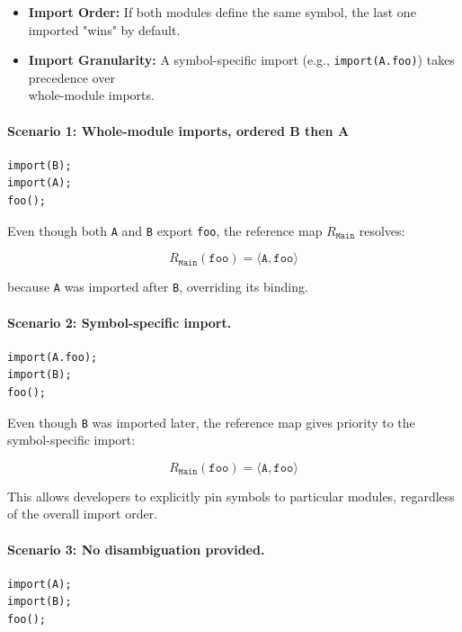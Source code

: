 \documentclass[sigplan,screen]{acmart}
\begin{document}
\begin{itemize}
	\item \textbf{Import Order:} If both modules define the same symbol, the last one imported "wins" by default.
	\item \textbf{Import Granularity:} A symbol-specific import (e.g., \texttt{import(A.foo)}) takes precedence over \\whole-module imports.
\end{itemize}

\paragraph{Scenario 1: Whole-module imports, ordered B then A}

\begin{verbatim}
import(B);
import(A);
foo();
\end{verbatim}

Even though both \texttt{A} and \texttt{B} export \texttt{foo}, the reference map $R_{\texttt{Main}}$ resolves:

\[
	R_{\texttt{Main}}(\texttt{foo}) = \langle \texttt{A}, \texttt{foo} \rangle
\]

because \texttt{A} was imported after \texttt{B}, overriding its binding.

\paragraph{Scenario 2: Symbol-specific import.}

\begin{verbatim}
import(A.foo);
import(B);
foo();
\end{verbatim}

Even though \texttt{B} was imported later, the reference map gives priority to the symbol-specific import:

\[
	R_{\texttt{Main}}(\texttt{foo}) = \langle \texttt{A}, \texttt{foo} \rangle
\]

This allows developers to explicitly pin symbols to particular modules, regardless of the overall import order.

\paragraph{Scenario 3: No disambiguation provided.}

\begin{verbatim}
import(A);
import(B);
foo();
\end{verbatim}
\end{document}
